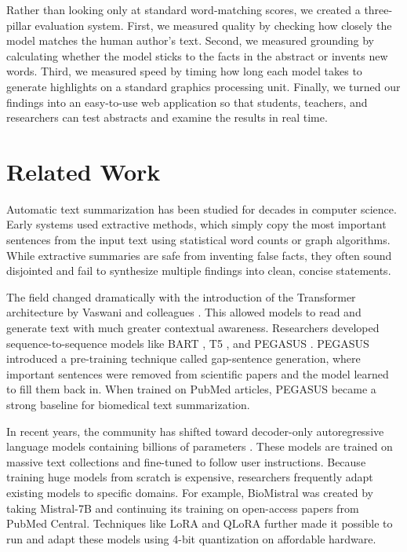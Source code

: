 \documentclass[11pt,a4paper]{article}
\begin{document}
Rather than looking only at standard word-matching scores, we created a three-pillar evaluation system. First, we measured quality by checking how closely the model matches the human author's text. Second, we measured grounding by calculating whether the model sticks to the facts in the abstract or invents new words. Third, we measured speed by timing how long each model takes to generate highlights on a standard graphics processing unit. Finally, we turned our findings into an easy-to-use web application so that students, teachers, and researchers can test abstracts and examine the results in real time.

\section{Related Work}
\label{sec:related}
Automatic text summarization has been studied for decades in computer science. Early systems used extractive methods, which simply copy the most important sentences from the input text using statistical word counts or graph algorithms. While extractive summaries are safe from inventing false facts, they often sound disjointed and fail to synthesize multiple findings into clean, concise statements.

The field changed dramatically with the introduction of the Transformer architecture by Vaswani and colleagues \cite{vaswani2017attention}. This allowed models to read and generate text with much greater contextual awareness. Researchers developed sequence-to-sequence models like BART \cite{lewis2020bart}, T5 \cite{raffel2020t5}, and PEGASUS \cite{zhang2020pegasus}. PEGASUS introduced a pre-training technique called gap-sentence generation, where important sentences were removed from scientific papers and the model learned to fill them back in. When trained on PubMed articles, PEGASUS became a strong baseline for biomedical text summarization.

In recent years, the community has shifted toward decoder-only autoregressive language models containing billions of parameters \cite{yang2024qwen25, dubey2024llama3}. These models are trained on massive text collections and fine-tuned to follow user instructions. Because training huge models from scratch is expensive, researchers frequently adapt existing models to specific domains. For example, BioMistral \cite{labrak2024biomistral} was created by taking Mistral-7B and continuing its training on open-access papers from PubMed Central. Techniques like LoRA \cite{hu2022lora} and QLoRA \cite{dettmers2023qlora} further made it possible to run and adapt these models using 4-bit quantization on affordable hardware.
\end{document}
